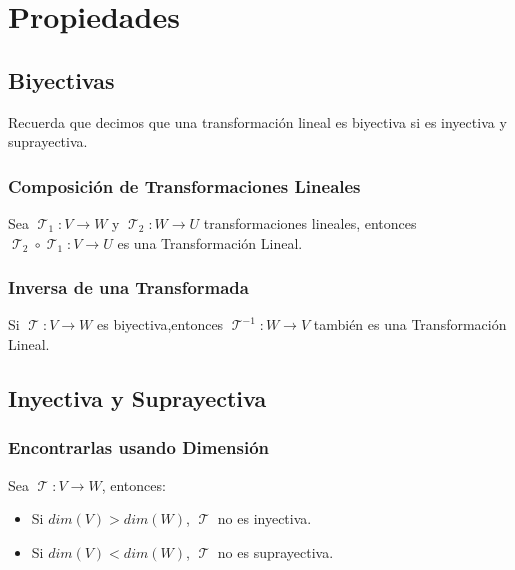 \documentclass[12pt]{report}                                    %
\DeclareMathOperator \LinealTransformation {\mathcal{T}}        %
\DeclareMathOperator \LT {\mathcal{T}}                          %
\begin{document}
    \clearpage
    \section{Propiedades}

        \subsection{Biyectivas}
        
            Recuerda que decimos que una transformación lineal es biyectiva si es inyectiva y suprayectiva.

            \subsubsection{Composición de Transformaciones Lineales}
            Sea $\LT_1 : V \to W $ y $\LT_2 : W \to U $ transformaciones lineales, entonces
            $\LT_2 \circ \LT_1: V \to U$ es una Transformación Lineal.


            \subsubsection{Inversa de una Transformada}
            Si $\LinealTransformation : V \to W$ es biyectiva,entonces
            $\LinealTransformation^{-1}: W \to V$ también es una Transformación Lineal.


        \subsection{Inyectiva y Suprayectiva}

            \subsubsection{Encontrarlas usando Dimensión}

                Sea $\LinealTransformation: V \to W$, entonces:

                \begin{itemize}
                    \item Si $dim(V) > dim(W)$, $\LT$ no es inyectiva.
                    \item Si $dim(V) < dim(W)$, $\LT$ no es suprayectiva.
                \end{itemize}
\end{document}
